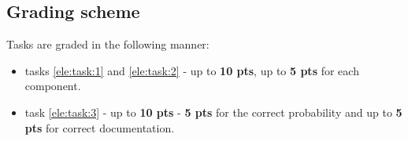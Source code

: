 \documentclass[a4paper]{article}
\begin{document}
\subsection{Grading scheme}
Tasks are graded in the following manner:
\begin{itemize}
\item tasks \ref{ele:task:1} and \ref{ele:task:2} - up to \textbf{10 pts}, 
up to \textbf{5 pts} for each component.
\item task \ref{ele:task:3} - up to \textbf{10 pts} - \textbf{5 pts} for the 
correct probability and up to \textbf{5 pts} for correct documentation.
\end{itemize}

 
\end{document}
